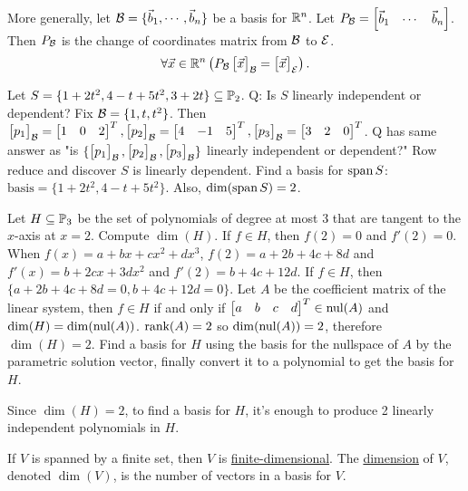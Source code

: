 \documentclass[10pt,a4paper]{article}
\begin{document}
More generally, let $\mathcal{B} = \{\vec{b}_1,\cdots,\vec{b}_n\}$ be a basis for $\mathbb{R}^n$. Let $P_{\mathcal{B}} = \begin{bmatrix}\vec{b}_1&\cdots&\vec{b}_n\end{bmatrix}$. Then $P_{\mathcal{B}}$ is the change of coordinates matrix from $\mathcal{B}$ to $\mathcal{E}$. 
$$\forall \vec{x}\in \mathbb{R}^n\left(P_{\mathcal{B}} \begin{bmatrix}\vec{x}\end{bmatrix}_{\mathcal{B}} = \begin{bmatrix}\vec{x}\end{bmatrix}_{\mathcal{E}}\right).$$

\begin{example}
	Let $S = \{1+2t^2,4-t+5t^2,3+2t\}\subseteq \mathbb{P}_2$. Q: Is $S$ linearly independent or dependent? Fix $\mathcal{B} = \{1,t,t^2\}$. Then $\begin{bmatrix}p_1\end{bmatrix}_{\mathcal{B}} = \begin{bmatrix}1&0&2\end{bmatrix}^T,\begin{bmatrix}p_2\end{bmatrix}_{\mathcal{B}} = \begin{bmatrix}4&-1&5\end{bmatrix}^T,\begin{bmatrix}p_3\end{bmatrix}_{\mathcal{B}} = \begin{bmatrix}3&2&0\end{bmatrix}^T$. Q has same answer as "is $\{\begin{bmatrix}p_1\end{bmatrix}_{\mathcal{B}},\begin{bmatrix}p_2\end{bmatrix}_{\mathcal{B}},\begin{bmatrix}p_3\end{bmatrix}_{\mathcal{B}}\}$ linearly independent or dependent?" Row reduce and discover $S$ is linearly dependent. Find a basis for $\text{span}\,S$: $\text{basis} = \{1+2t^2,4-t+5t^2\}$. Also, $\dim(\text{span}\,S) = 2$.
\end{example}
\begin{example}
	Let $H\subseteq \mathbb{P}_3$ be the set of polynomials of degree at most 3 that are tangent to the $x$-axis at $x=2$. Compute $\dim(H)$. If $f\in H$, then $f(2) = 0$ and $f'(2) = 0$. When $f(x) = a + bx + cx^2 + dx^3$, $f(2) = a + 2b + 4c + 8d$ and $f'(x) = b + 2cx + 3dx^2$ and $f'(2) = b + 4c + 12d$. If $f\in H$, then $\{a+2b+4c+8d = 0,b+4c+12d = 0\}$. Let $A$ be the coefficient matrix of the linear system, then $f\in H$ if and only if $\begin{bmatrix}a&b&c&d\end{bmatrix}^T\in \text{nul}(A)$ and $\dim(H) = \dim(\text{nul}(A))$. $\text{rank}(A) = 2$ so $\dim(\text{nul}(A)) = 2$, therefore $\dim(H) = 2$. Find a basis for $H$ using the basis for the nullspace of $A$ by the parametric solution vector, finally convert it to a polynomial to get the basis for $H$.
\end{example}
\begin{remark}
	Since $\dim(H) = 2$, to find a basis for $H$, it's enough to produce 2 linearly independent polynomials in $H$.
\end{remark}

\begin{definition}
	If $V$ is spanned by a finite set, then $V$ is \underline{finite-dimensional}. The \underline{dimension} of $V$, denoted $\dim(V)$, is the number of vectors in a basis for $V$.
\end{definition}

\end{document}
